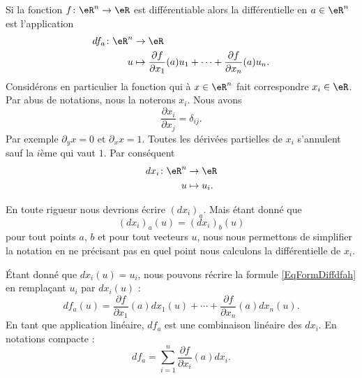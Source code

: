 Si la fonction $f\colon \eR^n\to \eR$ est différentiable alors la différentielle en $a\in\eR^n$ est l'application
\begin{equation}        \label{EqFormDiffdfah}
    \begin{aligned}
        df_a\colon \eR^n&\to \eR \\
        u&\mapsto \frac{ \partial f }{ \partial x_1 }(a)u_1+\cdots+\frac{ \partial f }{ \partial x_n }(a)u_n.
    \end{aligned}
\end{equation}
Considérons en particulier la fonction qui à $x\in\eR^n$ fait correspondre $x_i\in\eR$. Par abus de notations,  nous la noterons $x_i$. Nous avons 
\begin{equation}
    \frac{ \partial x_i }{ \partial x_j }=\delta_{ij}.
\end{equation}
Par exemple $\partial_yx=0$ et $\partial_xx=1$. Toutes les dérivées partielles de $x_i$ s'annulent sauf la $i$ème qui vaut $1$. Par conséquent
\begin{equation}
    \begin{aligned}
        dx_i\colon \eR^n&\to \eR \\
        u&\mapsto u_i. 
    \end{aligned}
\end{equation}

\begin{remark}
    En toute rigueur nous devrions écrire $(dx_i)_a$. Mais étant donné que
    \begin{equation}
        (dx_i)_a(u)=(dx_i)_b(u)
    \end{equation}
    pour tout points $a$, $b$ et pour tout vecteurs $u$, nous nous permettons de simplifier la notation en ne précisant pas en quel point nous calculons la différentielle de $x_i$.
\end{remark}

Étant donné que $dx_i(u)=u_i$, nous pouvons récrire la formule \eqref{EqFormDiffdfah} en remplaçant $u_i$ par $dx_i(u)$ :
\begin{equation}
    df_a(u)=\frac{ \partial f }{ \partial x_1 }(a)dx_1(u)+\cdots+\frac{ \partial f }{ \partial x_n }(a)dx_n(u).
\end{equation}
En tant que application linéaire, $df_a$ est une combinaison linéaire des $dx_i$. En notations compacte :
\begin{equation}
    df_a=\sum_{i=1}^n\frac{ \partial f }{ \partial x_i }(a)dx_i.
\end{equation}


